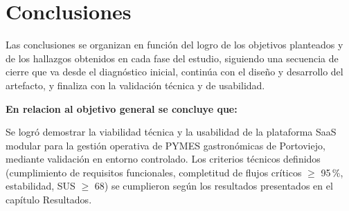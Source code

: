 \chapter{Conclusiones}

Las conclusiones se organizan en función del logro de los objetivos planteados y de los hallazgos obtenidos en cada fase del estudio, siguiendo una secuencia de cierre que va desde el diagnóstico inicial, continúa con el diseño y desarrollo del artefacto, y finaliza con la validación técnica y de usabilidad.

\textbf{En relacion al objetivo general se concluye que:} 

Se logró demostrar la viabilidad técnica y la usabilidad de la plataforma SaaS modular para la gestión operativa de PYMES gastronómicas de Portoviejo, mediante validación en entorno controlado. Los criterios técnicos definidos (cumplimiento de requisitos funcionales, completitud de flujos críticos $\geq$ 95\,\%, estabilidad, SUS $\geq$ 68) se cumplieron según los resultados presentados en el capítulo Resultados.

